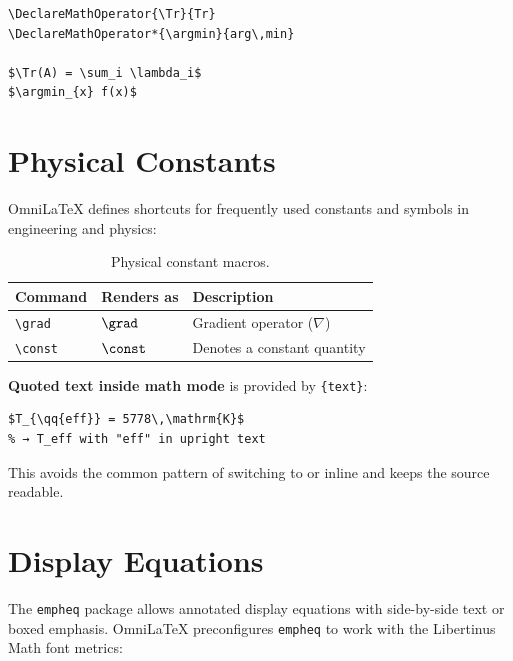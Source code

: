 \begin{verbatim}
\DeclareMathOperator{\Tr}{Tr}
\DeclareMathOperator*{\argmin}{arg\,min}

$\Tr(A) = \sum_i \lambda_i$
$\argmin_{x} f(x)$
\end{verbatim}

\section{Physical Constants}

OmniLaTeX defines shortcuts for frequently used constants and symbols in
engineering and physics:

\begin{table}[htbp]
  \centering
  \caption{Physical constant macros.}
  \label{tab:constants}
  \begin{tabular}{@{}lll@{}}
    \toprule
    Command          & Renders as & Description \\
    \midrule
    \texttt{\textbackslash grad}  & $\grad$  & Gradient operator ($\nabla$) \\
    \texttt{\textbackslash const} & $\const$ & Denotes a constant quantity \\
    \bottomrule
  \end{tabular}
\end{table}

\textbf{Quoted text inside math mode} is provided by \texttt{\{text\}}:

\begin{verbatim}
$T_{\qq{eff}} = 5778\,\mathrm{K}$
% → T_eff with "eff" in upright text
\end{verbatim}

This avoids the common pattern of switching to  or
 inline and keeps the source readable.

\section{Display Equations}

The \texttt{empheq} package allows annotated display equations with
side-by-side text or boxed emphasis.  OmniLaTeX preconfigures
\texttt{empheq} to work with the Libertinus Math font metrics:

